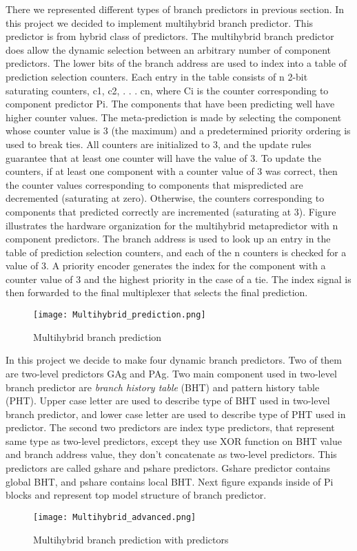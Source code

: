 \documentclass{scrreprt}
\begin{document}
There we represented different types of branch predictors in previous section. In this project we decided to implement multihybrid branch predictor. This predictor is from hybrid class of predictors. 
\newline
The multihybrid branch predictor does allow the dynamic selection between an arbitrary number of component predictors. The lower bits of the branch address are used to index into a table of prediction selection counters. Each entry in the table consists of n 2-bit saturating counters, c1, c2, . . . cn, where Ci is the counter corresponding to component predictor Pi. The components that have been predicting well have higher counter values. The meta-prediction is made by selecting the component whose counter value is 3 (the maximum) and a predetermined priority ordering is used to break ties. All counters are initialized to 3, and the update rules guarantee that at least one counter will have the value of 3. To update the counters, if at least one component with a counter value of 3 was correct, then the counter values corresponding to components that mispredicted are decremented (saturating at zero). Otherwise, the counters corresponding to components that predicted correctly are incremented (saturating at 3).
\newline
Figure illustrates the hardware organization for the multihybrid metapredictor with n component predictors. The branch address is used to look up an entry in the table of prediction selection counters, and each of the n counters is checked for a value of 3. A priority encoder generates the index for the component with a counter value of 3 and the highest priority in the case of a tie. The index signal is then forwarded to the final multiplexer that selects the final prediction.
\begin{figure}[ht]
    \centering
    \texttt{[image: Multihybrid\_prediction.png]}
    \caption{Multihybrid branch prediction}
    \label{fig:Multihybrid branch prediction}
\end{figure}
\newline
In this project we decide to make four dynamic branch predictors. Two of them are two-level predictors GAg and PAg. Two main component used in two-level branch predictor are \textit{branch history table} (BHT) and pattern history table (PHT). Upper case letter are used to describe type of BHT used in two-level branch predictor, and lower case letter are used to describe type of PHT used in predictor. The second two predictors are index type predictors, that represent same type as two-level predictors, except they use XOR function on BHT value and branch address value, they don't concatenate as two-level predictors. This predictors are called gshare and pshare predictors. Gshare predictor contains global BHT, and pshare contains local BHT. Next figure expands inside of Pi blocks and represent top model structure of branch predictor. 
\begin{figure}[ht]
    \centering
    \texttt{[image: Multihybrid\_advanced.png]}
    \caption{Multihybrid branch prediction with predictors}
    \label{fig:M2}
\end{figure}
\end{document}
